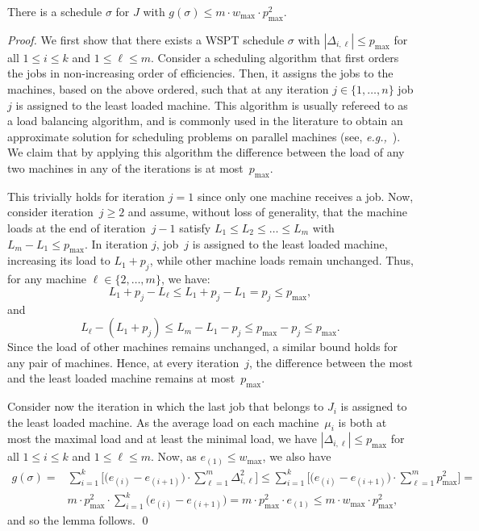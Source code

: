 \documentclass[11pt]{llncs}
\begin{document}
\begin{lemma} 
\label{lemma:opt-bound}
There is a schedule $\sigma$ for $J$ with $g(\sigma) \leq m \cdot w_{\max} \cdot p_{\max}^2$.
\end{lemma}
\begin{proof}
We first show that there exists a WSPT schedule $\sigma$ with $|\Delta_{i,\ell}|  \leq p_{\max}$ for all $1 \leq i \leq k$ and $1 \leq \ell \leq m$. Consider a scheduling algorithm that first orders the jobs in non-increasing order of efficiencies. Then, it assigns the jobs to the machines, based on the above ordered, such that at any iteration $j \in \{1,\ldots,n\}$ job $j$ is assigned to the least loaded machine. This algorithm is usually refereed to as a load balancing algorithm, and is commonly used in the literature to obtain an approximate solution for scheduling problems on parallel machines (see, \emph{e.g.,}~\cite{Azar,Taub}). We claim that by applying this algorithm the difference between the load of any two machines in any of the iterations is at most~$p_{\max}$. 

This trivially holds for iteration $j=1$ since only one machine receives a job. Now, consider iteration~$j \geq 2$ and assume, without loss of generality, that the machine loads at the end of iteration~$j-1$ satisfy $L_1\leq L_2\leq\ldots \leq L_m$ with~$L_m-L_1 \leq p_{\max}$. In iteration $j$, job~$j$ is assigned to the least loaded machine, increasing its load to $L_1+p_j$, while other machine loads remain unchanged. Thus, for any machine $\ell \in \{2, \ldots, m\}$, we have:
$$
L_1+p_j-L_\ell \leq L_1+p_j-L_1=p_j \leq p_{\max},
$$
and
$$
L_\ell- (L_1 + p_j) \leq L_m- L_1 - p_j \leq p_{\max} - p_j \leq p_{\max}.
$$
Since the load of other machines remains unchanged, a similar bound holds for any pair of machines. Hence, at every iteration~$j$, the difference between the most and the least loaded machine remains at most~$p_{\max}$.

Consider now the iteration in which the last job that belongs to $J_i$ is assigned to the least loaded machine. As the average load on each machine~$\mu_i$ is both at most the maximal load and at least the minimal load, we have $|\Delta_{i,\ell}|  \leq p_{\max}$ for all $1 \leq i \leq k$ and $1 \leq \ell \leq m$. Now, as $e_{(1)} \leq w_{\max}$, we also have 
\begin{align*}
g(\sigma) = &\sum_{i = 1}^{k}  \Big[ \big(e_{(i)}-e_{(i+1)}\big)  \cdot \sum^{m}_{\ell=1} \Delta^2_{i,\ell} \Big] \le \sum_{i = 1}^{k}  \Big[ \big(e_{(i)}-e_{(i+1)}\big)  \cdot \sum^{m}_{\ell=1}  p^2_{\max} \Big] =\\ 
&m \cdot  p_{\max}^2 \cdot \sum_{i = 1}^{k} \big(e_{(i)}-e_{(i+1)}\big) = m \cdot  p_{\max}^2 \cdot e_{(1)} \le m \cdot w_{\max} \cdot p_{\max}^2,
\end{align*}
and so the lemma follows. \qed
\end{proof}
\end{document}
